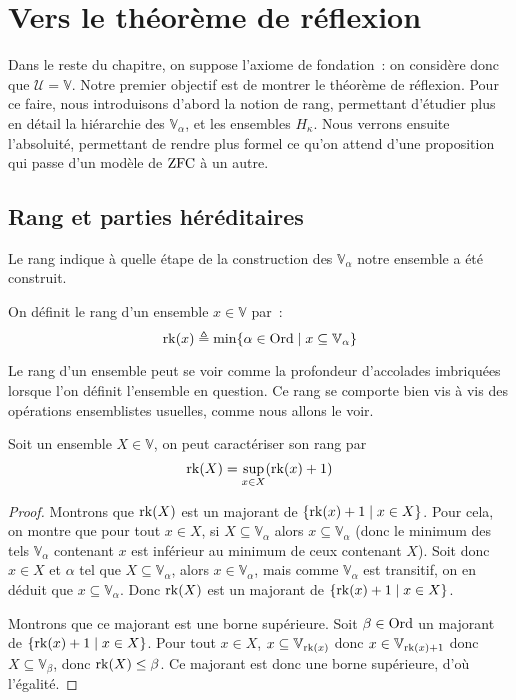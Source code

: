 \section{Vers le théorème de réflexion}

Dans le reste du chapitre, on suppose l'axiome de fondation~: on considère donc
que $\mathcal U = \mathbb V$. Notre premier objectif est de montrer le théorème
de réflexion. Pour ce faire, nous introduisons d'abord la notion de rang,
permettant d'étudier plus en détail la hiérarchie des $\mathbb V_\alpha$, et les
ensembles $H_\kappa$. Nous verrons ensuite l'absoluité, permettant de rendre plus
formel ce qu'on attend d'une proposition qui passe d'un modèle de $\operatorname{ZFC}$ à un
autre.

\subsection{Rang et parties héréditaires}

Le rang indique à quelle étape de la construction des $\mathbb V_\alpha$ notre
ensemble a été construit.

\begin{definition}[Rang]
  On définit le rang d'un ensemble $x\in\mathbb V$ par~:
  \[\operatorname{rk}(x) \triangleq \min \{\alpha \in \operatorname{Ord}\mid x\subseteq \mathbb V_\alpha\}\]
\end{definition}

Le rang d'un ensemble peut se voir comme la profondeur d'accolades imbriquées
lorsque l'on définit l'ensemble en question. Ce rang se comporte bien vis à vis
des opérations ensemblistes usuelles, comme nous allons le voir.

\begin{proposition}\label{prop.cara.rk}
  Soit un ensemble $X\in\mathbb V$, on peut caractériser son rang par
  \[\operatorname{rk}(X) = \sup_{x \in X} (\operatorname{rk}(x) + 1)\]
\end{proposition}

\begin{proof}
  Montrons que $\operatorname{rk}(X)$ est un majorant de $\{\operatorname{rk}(x)+1 \mid x \in X\}$.
  Pour cela, on montre que pour tout $x \in X$, si $X\subseteq \mathbb V_\alpha$
  alors $x\subseteq \mathbb V_\alpha$ (donc le minimum des tels
  $\mathbb V_\alpha$ contenant $x$ est inférieur au minimum de ceux contenant
  $X$). Soit donc $x \in X$ et $\alpha$ tel que $X\subseteq \mathbb V_\alpha$,
  alors $x\in \mathbb V_\alpha$, mais comme $\mathbb V_\alpha$ est transitif, on
  en déduit que $x\subseteq \mathbb V_\alpha$. Donc $\operatorname{rk}(X)$ est un majorant de
  $\{\operatorname{rk}(x) + 1 \mid x \in X\}$.

  Montrons que ce majorant est une borne supérieure. Soit $\beta\in\operatorname{Ord}$ un
  majorant de $\{\operatorname{rk}(x)+1\mid x \in X\}$. Pour tout $x\in X$,
  $x\subseteq \mathbb V_{\operatorname{rk}(x)}$ donc $x\in \mathbb V_{\operatorname{rk}(x)+1}$ donc
  $X\subseteq \mathbb V_\beta$, donc $\operatorname{rk}(X) \leq \beta$. Ce majorant est donc
  une borne supérieure, d'où l'égalité.
\end{proof}

